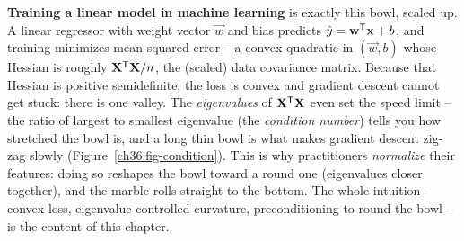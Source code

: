 \begin{applicationbox}
\textbf{Training a linear model in machine learning} is exactly this bowl, scaled up.
A linear regressor with weight vector $\vec{w}$ and bias predicts $\hat y = \mathbf{w}^{\mathsf{T}}
\mathbf{x}+b$, and training minimizes mean squared error -- a convex quadratic in
$(\vec{w},b)$ whose Hessian is roughly $\mathbf{X}^{\mathsf{T}}\mathbf{X}/n$, the (scaled) data
covariance matrix. Because that Hessian is positive semidefinite, the loss is convex
and gradient descent cannot get stuck: there is one valley. The \emph{eigenvalues} of
$\mathbf{X}^{\mathsf{T}}\mathbf{X}$ even set the speed limit -- the ratio of largest to smallest
eigenvalue (the \emph{condition number}) tells you how stretched the bowl is, and a
long thin bowl is what makes gradient descent zig-zag slowly
(Figure~\ref{ch36:fig-condition}). This is why
practitioners \emph{normalize} their features: doing so reshapes the bowl toward a
round one (eigenvalues closer together), and the marble rolls straight to the
bottom. The whole intuition -- convex loss, eigenvalue-controlled curvature,
preconditioning to round the bowl -- is the content of this chapter.
\end{applicationbox}

